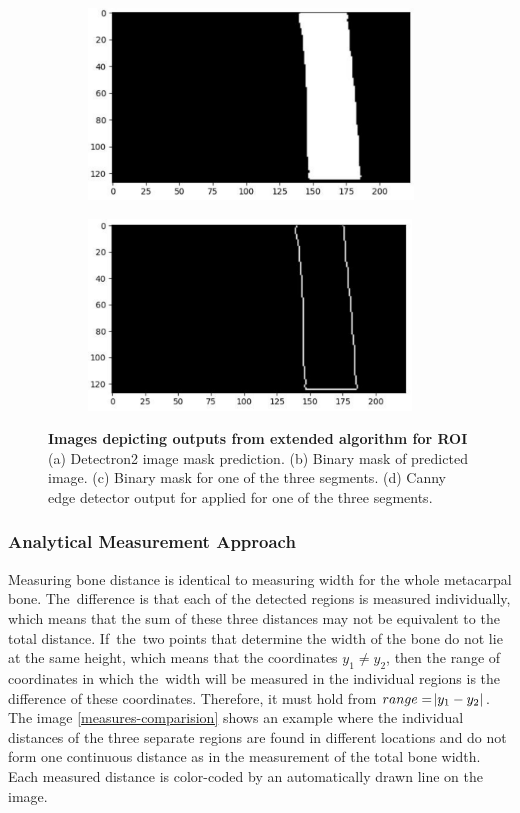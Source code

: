 \begin{figure}[ht]
    \begin{subfigure}[b]{.40\linewidth}
    \centering
        \includegraphics[width=\linewidth, height=2in]{obrazky-figures/ROI_one_mask.pdf}
        \caption{}\label{One-Mask-ROI}
    \end{subfigure}
    \hspace{1em}
     \begin{subfigure}[b]{.40\linewidth}
     \centering
        \includegraphics[width=\linewidth, height=2in]{obrazky-figures/ROI_one_canny.pdf}
        \caption{}\label{One-Canny-ROI}
    \end{subfigure}
    \label{ROI-inference}
    \caption{\textbf{Images depicting outputs from extended algorithm for ROI} (a) Detectron2 image mask prediction. (b) Binary mask of predicted image. (c) Binary mask for one of the three segments. (d) Canny edge detector output for applied for one of the three segments.}
\end{figure}


\subsubsection*{Analytical Measurement Approach}
Measuring bone distance is identical to measuring width for the whole metacarpal bone. The~difference is that each of the detected regions is measured individually, which means that the sum of these three distances may not be equivalent to the total distance. If~the~two points that determine the width of the bone do not lie at the same height, which means that the coordinates \(y_1\neq y_2 \), then the range of coordinates in which the~width will be measured in the individual regions is the difference of these coordinates. Therefore, it must hold from $range = \abs{y_1 - y_2}$. The image \ref{measures-comparision} shows an example where the individual distances of the three separate regions are found in different locations and do not form one continuous distance as in the measurement of the total bone width. Each measured distance is color-coded by an automatically drawn line on the image.

